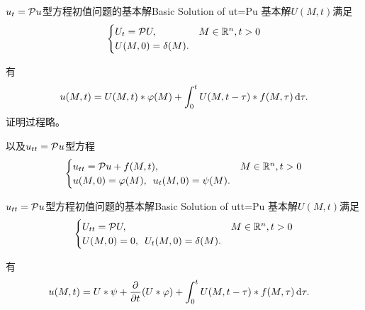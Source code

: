 \begin{definition}{$u_t=\mathcal P u$型方程初值问题的基本解}{Basic Solution of ut=Pu}
	基本解$U(M,t)$满足
	\begin{align}
		\begin{cases}
			U_t=\mathcal P U,&M\in\mathbb R^n,t>0\\
			U(M,0)=\mathop{}\!\delta(M).
		\end{cases}
	\end{align}
\end{definition}
有
\begin{align}
	u(M,t)=U(M,t)\ast\varphi(M)+\int_0^tU(M,t-\tau)\ast f(M,\tau)\mathop{}\!\mathrm{d}\tau.
\end{align}
证明过程略。

以及$u_{tt}=\mathcal P u$型方程
\begin{align}
	\begin{cases}
		u_{tt}=\mathcal P u+f(M,t),&M\in\mathbb R^n,t>0\\
		u(M,0)=\varphi(M),\enspace u_t(M,0)=\psi(M).
	\end{cases}
\end{align}
\begin{definition}{$u_{tt}=\mathcal P u$型方程初值问题的基本解}{Basic Solution of utt=Pu}
	基本解$U(M,t)$满足
	\begin{align}
		\begin{cases}
			U_{tt}=\mathcal P U,&M\in\mathbb R^n,t>0\\
			U(M,0)=0,\enspace U_t(M,0)=\mathop{}\!\delta(M).
		\end{cases}
	\end{align}
\end{definition}
有
\begin{align}
	\begin{aligned}
		u(M,t)=&\;U\ast\psi+\frac{\partial^{{}}}{\partial{t}^{{}}}(U\ast\varphi)+\int_0^tU(M,t-\tau)\ast f(M,\tau)\mathop{}\!\mathrm{d}\tau.
	\end{aligned}
\end{align}

